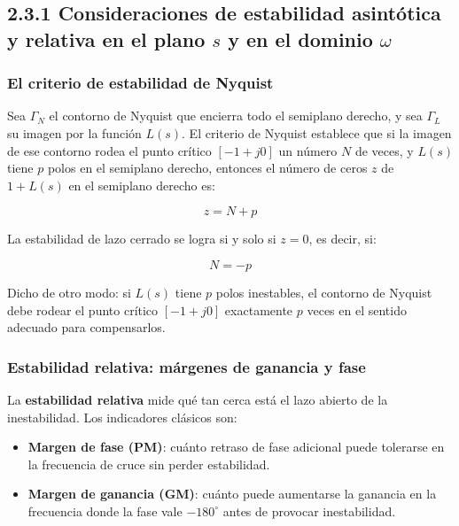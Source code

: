 \subsection{2.3.1 Consideraciones de estabilidad asintótica y relativa en el plano \(s\) y en el dominio \(\omega\)}

\subsubsection{El criterio de estabilidad de Nyquist}
Sea \(\Gamma_N\) el contorno de Nyquist que encierra todo el semiplano derecho, y sea \(\Gamma_L\) su imagen por la función \(L(s)\). El criterio de Nyquist establece que si la imagen de ese contorno rodea el punto crítico \([-1+j0]\) un número \(N\) de veces, y \(L(s)\) tiene \(p\) polos en el semiplano derecho, entonces el número de ceros \(z\) de \(1+L(s)\) en el semiplano derecho es:

\[
z=N+p \tag{2.3.1}
\]

La estabilidad de lazo cerrado se logra si y solo si \(z=0\), es decir, si:

$$
N=-p
$$

Dicho de otro modo: si \(L(s)\) tiene \(p\) polos inestables, el contorno de Nyquist debe rodear el punto crítico \([-1+j0]\) exactamente \(p\) veces en el sentido adecuado para compensarlos.


\subsubsection{Estabilidad relativa: márgenes de ganancia y fase}
La \textbf{estabilidad relativa} mide qué tan cerca está el lazo abierto de la inestabilidad. Los indicadores clásicos son:

\begin{itemize}
  \item \textbf{Margen de fase (PM)}: cuánto retraso de fase adicional puede tolerarse en la frecuencia de cruce sin perder estabilidad.
  \item \textbf{Margen de ganancia (GM)}: cuánto puede aumentarse la ganancia en la frecuencia donde la fase vale \(-180^\circ\) antes de provocar inestabilidad.
\end{itemize}

